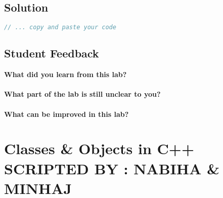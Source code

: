 \documentclass[11pt,fleqn]{book} %
\begin{document}

\newpage
\section{Solution}
\begin{lstlisting}[language=C++]
  // ... copy and paste your code
\end{lstlisting}

\newpage
\section{Student Feedback}
\textbf{What did you learn from this lab?}\\
\noindent\fbox{\parbox{\textwidth}{
  }
}\\
\textbf{What part of the lab is still unclear to you?}\\
\noindent\fbox{\parbox{\textwidth}{
  }
}\\
\textbf{What can be improved in this lab?}\\ 
\noindent\fbox{\parbox{\textwidth}{
  }
}

\newpage

\chapter{Classes \& Objects in C++ \hspace{14mm} {\textsc{\small SCRIPTED BY : NABIHA \& MINHAJ}}}
\end{document}

